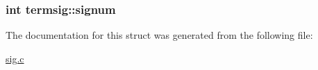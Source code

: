 \subsubsection[{\texorpdfstring{signum}{signum}}]{\setlength{\rightskip}{0pt plus 5cm}int termsig\+::signum}\hypertarget{structtermsig_aa38dcc7e498d80724e4541257c8726e5}{}\label{structtermsig_aa38dcc7e498d80724e4541257c8726e5}


The documentation for this struct was generated from the following file\+:\begin{DoxyCompactItemize}
\item 
\hyperlink{sig_8c}{sig.\+c}\end{DoxyCompactItemize}
